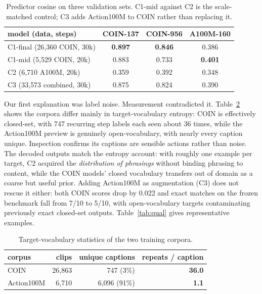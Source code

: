 \documentclass[journal]{IEEEtran}
\begin{document}
\begin{table}[t]
\caption{Predictor cosine on three validation sets. C1-mid against C2 is the
scale-matched control; C3 adds Action100M to COIN rather than replacing it.}
\label{tab:a100m}
\centering
\footnotesize
\setlength{\tabcolsep}{3pt}
\begin{tabular}{lccc}
\toprule
model (data, steps) & COIN-137 & COIN-956 & A100M-160 \\
\midrule
C1-final (26{,}360 COIN, 30k) & \textbf{0.897} & \textbf{0.846} & 0.386 \\
C1-mid (5{,}529 COIN, 20k) & 0.883 & 0.733 & \textbf{0.401} \\
C2 (6{,}710 A100M, 20k) & 0.359 & 0.392 & 0.348 \\
C3 (33{,}573 combined, 30k) & 0.875 & 0.824 & 0.390 \\
\bottomrule
\end{tabular}
\end{table}

Our first explanation was label noise. Measurement contradicted it.
Table~\ref{tab:vocab} shows the corpora differ mainly in target-vocabulary
entropy: COIN is effectively closed-set, with 747 recurring step labels each seen
about 36 times, while the Action100M preview is genuinely open-vocabulary, with
nearly every caption unique. Inspection confirms its captions are sensible actions
rather than noise. The decoded outputs match the entropy account: with roughly one
example per target, C2 acquired the \emph{distribution of phrasings} without
binding phrasing to content, while the COIN models' closed vocabulary transfers
out of domain as a coarse but useful prior. Adding Action100M as augmentation (C3)
does not rescue it either: both COIN scores drop by 0.022 and exact matches on the
frozen benchmark fall from 7/10 to 5/10, with open-vocabulary targets contaminating
previously exact closed-set outputs. Table~\ref{tab:qual} gives representative
examples.

\begin{table}[t]
\caption{Target-vocabulary statistics of the two training corpora.}
\label{tab:vocab}
\centering
\footnotesize
\setlength{\tabcolsep}{6pt}
\begin{tabular}{lrrr}
\toprule
corpus & clips & unique captions & repeats / caption \\
\midrule
COIN & 26{,}863 & 747 (3\%) & \textbf{36.0} \\
Action100M & 6{,}710 & 6{,}096 (91\%) & \textbf{1.1} \\
\bottomrule
\end{tabular}
\end{table}
\end{document}
